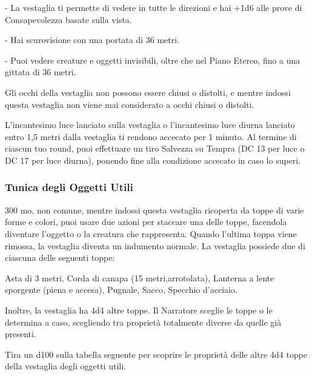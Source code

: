 \begin{multicols}{2}
	- La vestaglia ti permette di vedere in tutte le direzioni e hai +1d6 alle prove di Consapevolezza basate sulla vista.

	- Hai scurovisione con una portata di 36 metri.

	- Puoi vedere creature e oggetti invisibili, oltre che nel Piano Etereo, fino a una gittata di 36 metri.

	Gli occhi della vestaglia non possono essere chiusi o distolti, e mentre indossi questa vestaglia non viene mai considerato a occhi chiusi o distolti.

	L'incantesimo luce lanciato sulla vestaglia o l'incantesimo luce diurna lanciato entro 1,5 metri dalla vestaglia ti rendono accecato per 1 minuto. Al termine di ciascun tuo round, puoi effettuare un tiro Salvezza su Tempra (DC 13 per luce o DC 17 per luce diurna), ponendo fine alla condizione accecato in caso lo superi.

	\subsubsection*{Tunica degli Oggetti Utili}
	300 mo, non comune, mentre indossi questa vestaglia ricoperta da toppe di varie forme e colori, puoi usare due azioni per staccare una delle toppe, facendola diventare l'oggetto o la creatura che rappresenta. Quando l'ultima toppa viene rimossa, la vestaglia diventa un indumento normale. La vestaglia possiede due di ciascuna delle seguenti toppe:

	Asta di 3 metri, Corda di canapa (15 metri,arrotolata), Lanterna a lente sporgente (piena e accesa), Pugnale, Sacco, Specchio d'acciaio.

	Inoltre, la vestaglia ha 4d4 altre toppe. Il Narratore sceglie le toppe o le determina a caso, scegliendo tra proprietà totalmente diverse da quelle già presenti.

	Tira un d100 sulla tabella seguente per scoprire le proprietà delle altre 4d4 toppe della vestaglia degli oggetti utili.

\end{multicols}


